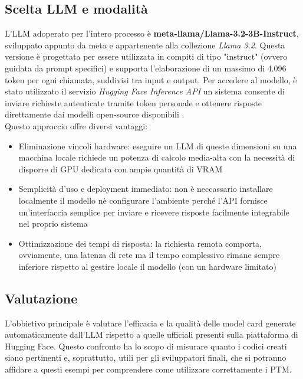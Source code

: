 \documentclass{article}
\begin{document}
\subsection{Scelta LLM e modalità}
L'LLM adoperato per l'intero processo è \textbf{meta-llama/Llama-3.2-3B-Instruct}, sviluppato appunto da meta e appartenente alla collezione \textit{Llama 3.2}. Questa versione è progettata per essere utilizzata in compiti di tipo "instruct" (ovvero guidata da prompt specifici) e supporta l’elaborazione di un massimo di 4.096 token per ogni chiamata, suddivisi tra input e output.  
Per accedere al modello, è stato utilizzato il servizio \textit{Hugging Face Inference API} un sistema consente di inviare richieste autenticate tramite token personale e ottenere risposte direttamente dai modelli open-source disponibili .\\
Questo approccio offre diversi vantaggi:
\begin{itemize}
    \item Eliminazione vincoli hardware: eseguire un LLM di queste dimensioni su una macchina locale richiede un potenza di calcolo media-alta con la necessità di disporre di GPU dedicata con ampie quantità di VRAM
    \item Semplicità d'uso e deployment immediato: non è neccassario installare localmente il modello nè configurare l'ambiente perché l'API fornisce un'interfaccia semplice per inviare e ricevere risposte facilmente integrabile nel proprio sistema
    \item Ottimizzazione dei tempi di risposta: la richiesta remota comporta, ovviamente, una latenza di rete ma il tempo complessivo rimane sempre inferiore rispetto al gestire locale il modello (con un hardware limitato)
\end{itemize}
\subsection{Valutazione}
L'obbietivo principale è valutare l'efficacia e la qualità delle model card generate automaticamente dall'LLM rispetto a quelle ufficiali presenti sulla piattaforma di Hugging Face.  Questo confronto ha lo scopo di misurare quanto i codici creati siano pertinenti e, soprattutto, utili per gli sviluppatori finali, che si potranno affidare a questi esempi per comprendere come utilizzare correttamente i PTM.
\end{document}

